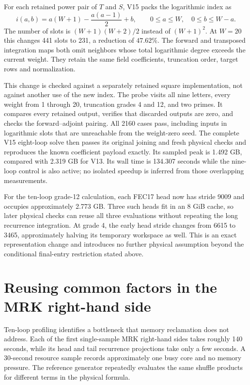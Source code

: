 \documentclass[11pt]{article}
\begin{document}
For each retained power pair of $T$ and $S$, V15 packs the logarithmic index
as
\[
 i(a,b)=a(W+1)-\frac{a(a-1)}{2}+b,
 \qquad 0\leq a\leq W,\quad 0\leq b\leq W-a.
\]
The number of slots is $(W+1)(W+2)/2$ instead of $(W+1)^2$.
At $W=20$ this changes 441 slots to 231, a reduction of $47.62\%$.
The forward and transposed integration maps both omit neighbors whose total
logarithmic degree exceeds the current weight. They retain the same field
coefficients, truncation order, target rows and normalization.

This change is checked against a separately retained square implementation,
not against another use of the new index. The probe visits all nine letters,
every weight from 1 through 20, truncation grades 4 and 12, and two primes.
It compares every retained output, verifies that discarded outputs are zero,
and checks the forward--adjoint pairing. All 2160 cases pass, including
inputs in logarithmic slots that are unreachable from the weight-zero seed.
The complete V15 eight-loop solve then passes its original joining and fresh
physical checks and reproduces the known coefficient payload exactly.
Its sampled peak is 1.492 GB, compared with 2.319 GB for V13. Its wall time
is 134.307 seconds while the nine-loop control is also active; no isolated
speedup is inferred from those overlapping measurements.

For the ten-loop grade-12 calculation, each FEC17 head now has stride 9009
and occupies approximately 2.773 GB. Three such heads fit in an 8 GiB cache,
so later physical checks can reuse all three evaluations without repeating
the long recurrence integration. At grade 4, the early head stride changes
from 6615 to 3465, approximately halving its temporary workspace as well.
This is an exact representation change and introduces no further physical
assumption beyond the conditional final-entry restriction stated above.

\section{Reusing common factors in the MRK right-hand side}
Ten-loop profiling identifies a bottleneck that memory reclamation does not
address. Each of the first single-sample MRK right-hand sides takes roughly
140 seconds, while its head and tail recurrence projections take only a few
seconds. A 30-second resource sample records approximately one busy core
and no memory pressure. The reference generator repeatedly evaluates the
same shuffle products for different terms in the physical formula.
\end{document}
